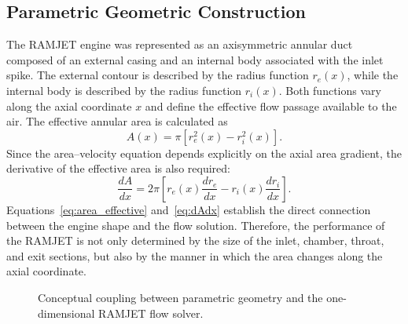 \documentclass[preprint,12pt]{elsarticle}
\begin{document}
\subsection{Parametric Geometric Construction}
The RAMJET engine was represented as an axisymmetric annular duct composed of an external casing and an internal body associated with the inlet spike. The external contour is described by the radius function $r_e(x)$, while the internal body is described by the radius function $r_i(x)$. Both functions vary along the axial coordinate $x$ and define the effective flow passage available to the air.
The effective annular area is calculated as
\begin{equation}
A(x)=\pi\left[r_e^2(x)-r_i^2(x)\right].
\label{eq:area_effective}
\end{equation}
Since the area--velocity equation depends explicitly on the axial area gradient, the derivative of the effective area is also required:
\begin{equation}
\frac{dA}{dx}
=
2\pi
\left[
r_e(x)\frac{dr_e}{dx}
-
r_i(x)\frac{dr_i}{dx}
\right].
\label{eq:dAdx}
\end{equation}
Equations~\eqref{eq:area_effective} and~\eqref{eq:dAdx} establish the direct connection between the engine shape and the flow solution. Therefore, the performance of the RAMJET is not only determined by the size of the inlet, chamber, throat, and exit sections, but also by the manner in which the area changes along the axial coordinate.
\begin{figure}[H]
\centering
{}
\caption{Conceptual coupling between parametric geometry and the one-dimensional RAMJET flow solver.}
\label{fig:geometry_flow_coupling}
\end{figure}
\end{document}

